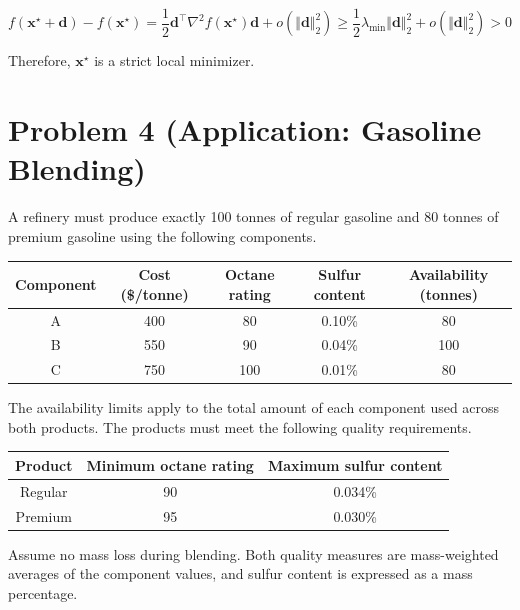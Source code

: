 \documentclass[10pt,a4paper]{article}
\begin{document}
\begin{enumerate}
\begin{enumerate}
        $$
        f(\mathbf{x}^\star + \mathbf{d}) - f(\mathbf{x}^\star)
        = \frac12 \mathbf{d}^\top \nabla^2 f(\mathbf{x}^\star) \mathbf{d} + o(\Vert \mathbf{d} \Vert_2^2)
        \geq \frac12 \lambda_{\min} \Vert \mathbf{d} \Vert_2^2 + o(\Vert \mathbf{d} \Vert_2^2)
        > 0
        $$

        Therefore, $\mathbf{x}^\star$ is a strict local minimizer.
    \end{enumerate}
\end{enumerate}

\newpage



\section*{Problem 4 (Application: Gasoline Blending)}
A refinery must produce exactly 100 tonnes of regular gasoline
and 80 tonnes of premium gasoline using the following components.

\begin{center}
\begin{tabular}{c|cccc}
\hline
Component & Cost (\$/tonne) & Octane rating & Sulfur content
          & Availability (tonnes) \\
\hline
A & 400 & 80  & 0.10\% & 80  \\
B & 550 & 90  & 0.04\% & 100 \\
C & 750 & 100 & 0.01\% & 80  \\
\hline
\end{tabular}
\end{center}

The availability limits apply to the total amount of each
component used across both products. The products must meet the following quality requirements.

\begin{center}
\begin{tabular}{c|cc}
\hline
Product & Minimum octane rating & Maximum sulfur content \\
\hline
Regular & 90 & 0.034\% \\
Premium & 95 & 0.030\% \\
\hline
\end{tabular}
\end{center}

Assume no mass loss during blending. Both quality measures are
mass-weighted averages of the component values, and sulfur content
is expressed as a mass percentage.
\end{document}
